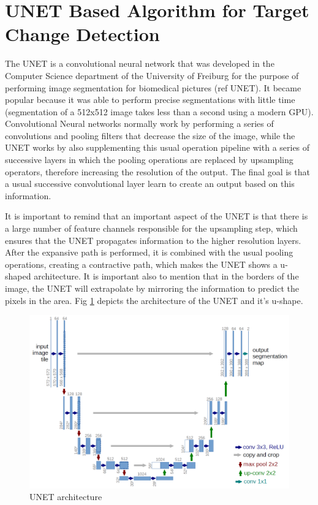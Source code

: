 \section{UNET Based Algorithm for Target Change Detection}
The UNET is a convolutional neural network that was developed in the Computer Science department of the University of Freiburg for the purpose of performing image segmentation for
biomedical pictures (ref UNET). It became popular because it was able to perform precise segmentations with little time (segmentation of a 512x512 image takes less than a second using a modern GPU).
Convolutional Neural networks normally work by performing a series of convolutions and pooling filters that decrease the size of the image, while the UNET works by also 
supplementing this usual operation pipeline with a series of successive layers in which the pooling operations are replaced by upsampling operators, therefore increasing the resolution of the output.
The final goal is that a usual successive convolutional layer learn to create an output based on this information. 

It is important to remind that an important aspect of the UNET is that there is a large number of feature channels responsible for the upsampling step, which ensures that the UNET propagates information
to the higher resolution layers. After the expansive path is performed, it is combined with the usual pooling operations, creating a contractive path, which makes the UNET shows a u-shaped architecture. 
It is important also to mention that in the borders of the image, the UNET will extrapolate by mirroring the information to predict the pixels in the area. 
Fig \ref{fig:unet_architecture} depicts the architecture of the UNET and it's u-shape.

\begin{figure}[ht]
    \centering
    \includegraphics[width=0.7\linewidth]{Chapter7/unet_architecture.png}
    \caption{UNET architecture}
    \label{fig:unet_architecture}
\end{figure}

